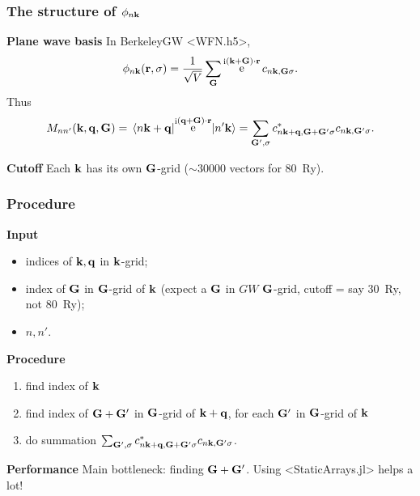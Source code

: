 \documentclass[t,aspectratio=169]{beamer}
\DeclareMathOperator{\ee}{e}
\DeclareMathOperator{\ii}{i}
\newcommand{\shortcode}[1]{\texttt{#1}}
\def\texttt#1{<#1>}%
\begin{document}
\begin{frame}
\frametitle{The structure of $\phi_{n \vb{k}}$}

\textbf{Plane wave basis} In BerkeleyGW \shortcode{WFN.h5}, 
\begin{equation*}
    \phi_{n \vb{k}}(\vb{r}, \sigma) = \frac{1}{\sqrt{V}} \sum_{\vb{G}} \ee^{\ii (\vb{k} + \vb{G}) \cdot \vb{r}} c_{n \vb{k}, \vb{G} \sigma}.
\end{equation*}    
Thus 
\begin{equation*}
    M_{nn'}(\vb{k}, \vb{q}, \vb{G}) 
    = \mel*{n \vb{k} + \vb{q}}{\ee^{\ii (\vb{q} + \vb{G}) \cdot \vb{r}}}{n' \vb{k}} 
    = \sum_{\vb{G}', \sigma} c^*_{n \vb{k} + \vb{q}, \vb{G} + \vb{G}' \sigma} c_{n \vb{k}, \vb{G}' \sigma}.
\end{equation*}

\textbf{Cutoff} Each $\vb{k}$ has its own $\vb{G}$-grid ($\sim 30000$ vectors for \SI{80}{Ry}).

\end{frame}

\begin{frame}
\frametitle{Procedure}

\textbf{Input} 
\begin{itemize}
    \item indices of $\vb{k}, \vb{q}$ in $\vb{k}$-grid; 
    \item index of $\vb{G}$ in $\vb{G}$-grid of $\vb{k}$ 
    (expect a $\vb{G}$ in $GW$ $\vb{G}$-grid, 
    cutoff = say \SI{30}{Ry}, not \SI{80}{Ry});
    \item $n, n'$.
\end{itemize}

\textbf{Procedure}
\begin{enumerate}
    \item find index of $\vb{k}$
    \item find index of $\vb{G} + \vb{G}'$ in $\vb{G}$-grid of $\vb{k} + \vb{q}$,
    for each $\vb{G}'$ in $\vb{G}$-grid of $\vb{k}$
    \item do summation $\sum_{\vb{G}', \sigma} c^*_{n \vb{k} + \vb{q}, \vb{G} + \vb{G}' \sigma} c_{n \vb{k}, \vb{G}' \sigma}$.
\end{enumerate}    

\vspace{0.3cm}

\textbf{Performance} Main bottleneck: finding $\vb{G} + \vb{G}'$.
Using \shortcode{StaticArrays.jl} helps a lot! 

\end{frame}
\end{document}

